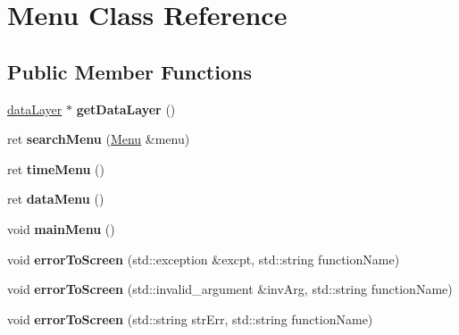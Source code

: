 \hypertarget{class_menu}{}\section{Menu Class Reference}
\label{class_menu}
\subsection*{Public Member Functions}
\begin{DoxyCompactItemize}
\item 
\hypertarget{class_menu_a9cd5db07a7034ba50adff2b42068c663}{}\hyperlink{classdata_layer}{data\+Layer} $\ast$ {\bfseries get\+Data\+Layer} ()\label{class_menu_a9cd5db07a7034ba50adff2b42068c663}

\item 
\hypertarget{class_menu_a8426a2c595f80ed2bdf6adf41b20ab23}{}ret {\bfseries search\+Menu} (\hyperlink{class_menu}{Menu} \&menu)\label{class_menu_a8426a2c595f80ed2bdf6adf41b20ab23}

\item 
\hypertarget{class_menu_aae2f8a2c958399965354e720e8a5b0f8}{}ret {\bfseries time\+Menu} ()\label{class_menu_aae2f8a2c958399965354e720e8a5b0f8}

\item 
\hypertarget{class_menu_a1b1a4c3750dce51b5f4f65b495e18609}{}ret {\bfseries data\+Menu} ()\label{class_menu_a1b1a4c3750dce51b5f4f65b495e18609}

\item 
\hypertarget{class_menu_aef9edee86d2ea460606361c92e061583}{}void {\bfseries main\+Menu} ()\label{class_menu_aef9edee86d2ea460606361c92e061583}

\item 
\hypertarget{class_menu_a87fe47c3d1f8dee745f9945573fc5739}{}void {\bfseries error\+To\+Screen} (std\+::exception \&excpt, std\+::string function\+Name)\label{class_menu_a87fe47c3d1f8dee745f9945573fc5739}

\item 
\hypertarget{class_menu_ac4b4e472b1dd5f9f5921ec185f47bb81}{}void {\bfseries error\+To\+Screen} (std\+::invalid\+\_\+argument \&inv\+Arg, std\+::string function\+Name)\label{class_menu_ac4b4e472b1dd5f9f5921ec185f47bb81}

\item 
\hypertarget{class_menu_a5609634dad68b95255522e17a1eb4c41}{}void {\bfseries error\+To\+Screen} (std\+::string str\+Err, std\+::string function\+Name)\label{class_menu_a5609634dad68b95255522e17a1eb4c41}


\end{DoxyCompactItemize}

